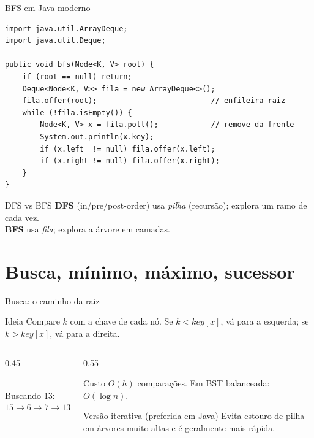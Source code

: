 \documentclass[aspectratio=169]{beamer}
\begin{document}
\begin{frame}[fragile,shrink=20]{BFS em Java moderno}
\begin{lstlisting}
import java.util.ArrayDeque;
import java.util.Deque;

public void bfs(Node<K, V> root) {
    if (root == null) return;
    Deque<Node<K, V>> fila = new ArrayDeque<>();
    fila.offer(root);                          // enfileira raiz
    while (!fila.isEmpty()) {
        Node<K, V> x = fila.poll();            // remove da frente
        System.out.println(x.key);
        if (x.left  != null) fila.offer(x.left);
        if (x.right != null) fila.offer(x.right);
    }
}
\end{lstlisting}
\begin{exampleblock}{DFS vs BFS}
\textbf{DFS} (in/pre/post-order) usa \emph{pilha} (recursão); explora um ramo de cada vez.\\
\textbf{BFS} usa \emph{fila}; explora a árvore em camadas.
\end{exampleblock}
\end{frame}

\section{Busca, mínimo, máximo, sucessor}

\begin{frame}[shrink=10]{Busca: o caminho da raiz}
\begin{block}{Ideia}
Compare $k$ com a chave de cada nó. Se $k < \mathit{key}[x]$, vá para a esquerda;
se $k > \mathit{key}[x]$, vá para a direita.
\end{block}
\begin{columns}[T]
\begin{column}{0.45\textwidth}
\centering
{}\\[2pt]
\small Buscando 13: $15 \to 6 \to 7 \to 13$
\end{column}
\begin{column}{0.55\textwidth}
\begin{block}{Custo}
$O(h)$ comparações. Em BST balanceada: $O(\log n)$.
\end{block}
\begin{exampleblock}{Versão iterativa (preferida em Java)}
Evita estouro de pilha em árvores muito altas
e é geralmente mais rápida.
\end{exampleblock}
\end{column}
\end{columns}
\end{frame}
\end{document}
